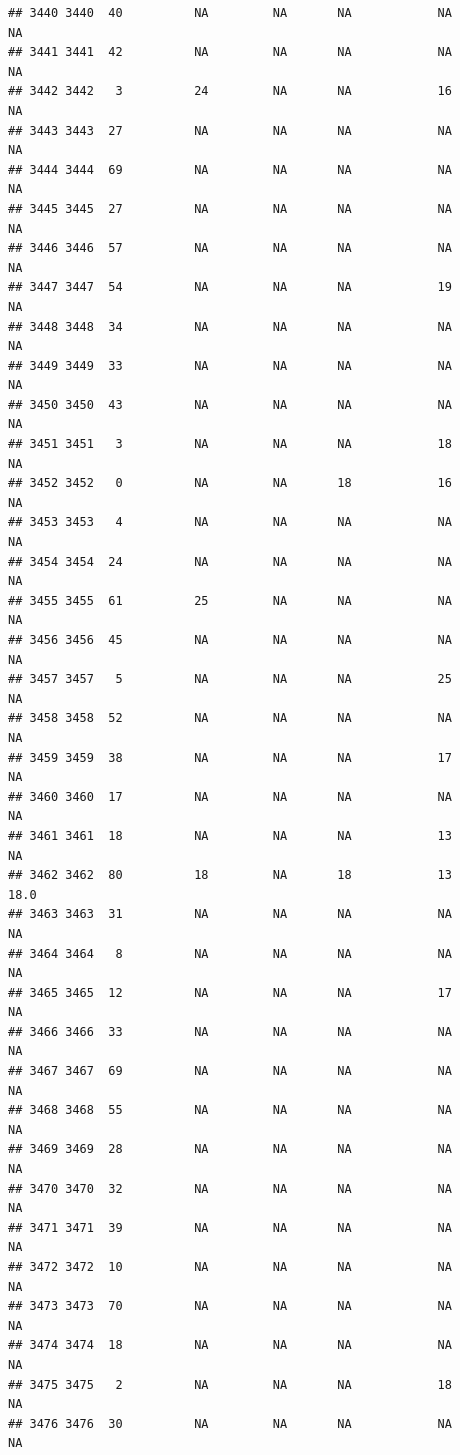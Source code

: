 \documentclass[man]{apa6}
\begin{document}
\begin{verbatim}
## 3440 3440  40          NA         NA       NA            NA       NA
## 3441 3441  42          NA         NA       NA            NA       NA
## 3442 3442   3          24         NA       NA            16       NA
## 3443 3443  27          NA         NA       NA            NA       NA
## 3444 3444  69          NA         NA       NA            NA       NA
## 3445 3445  27          NA         NA       NA            NA       NA
## 3446 3446  57          NA         NA       NA            NA       NA
## 3447 3447  54          NA         NA       NA            19       NA
## 3448 3448  34          NA         NA       NA            NA       NA
## 3449 3449  33          NA         NA       NA            NA       NA
## 3450 3450  43          NA         NA       NA            NA       NA
## 3451 3451   3          NA         NA       NA            18       NA
## 3452 3452   0          NA         NA       18            16       NA
## 3453 3453   4          NA         NA       NA            NA       NA
## 3454 3454  24          NA         NA       NA            NA       NA
## 3455 3455  61          25         NA       NA            NA       NA
## 3456 3456  45          NA         NA       NA            NA       NA
## 3457 3457   5          NA         NA       NA            25       NA
## 3458 3458  52          NA         NA       NA            NA       NA
## 3459 3459  38          NA         NA       NA            17       NA
## 3460 3460  17          NA         NA       NA            NA       NA
## 3461 3461  18          NA         NA       NA            13       NA
## 3462 3462  80          18         NA       18            13     18.0
## 3463 3463  31          NA         NA       NA            NA       NA
## 3464 3464   8          NA         NA       NA            NA       NA
## 3465 3465  12          NA         NA       NA            17       NA
## 3466 3466  33          NA         NA       NA            NA       NA
## 3467 3467  69          NA         NA       NA            NA       NA
## 3468 3468  55          NA         NA       NA            NA       NA
## 3469 3469  28          NA         NA       NA            NA       NA
## 3470 3470  32          NA         NA       NA            NA       NA
## 3471 3471  39          NA         NA       NA            NA       NA
## 3472 3472  10          NA         NA       NA            NA       NA
## 3473 3473  70          NA         NA       NA            NA       NA
## 3474 3474  18          NA         NA       NA            NA       NA
## 3475 3475   2          NA         NA       NA            18       NA
## 3476 3476  30          NA         NA       NA            NA       NA

\end{verbatim}
\end{document}
